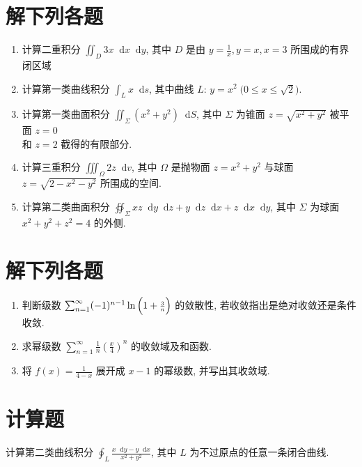 \documentclass[twocolumn,UTF8]{ctexart}
\newcommand\dif{\mathop{}\!\mathrm{d}}
\begin{document}
\newpage\section{解下列各题}
\begin{enumerate}
\item 计算二重积分 $\iint_D3x\dif x\dif y$, 其中 $D$ 是由 $y=\frac{1}{x}$,\,$y=x$,\,$x=3$  所围成的有界闭区域\\[5.5cm]
\item 计算第一类曲线积分 $\int_Lx\dif s$, 其中曲线 $L:\,y=x^2\;\big(0\leqslant x\leqslant\sqrt{2}\big)$.\\[5.5cm]
\item 计算第一类曲面积分 $\iint_\Sigma(x^2+y^2)\dif S$, 其中 $\Sigma$ 为锥面 $z=\sqrt{x^2+y^2}$ 被平面 $z=0$ \\
和 $z=2$ 截得的有限部分.
\end{enumerate}
\newpage%
\begin{enumerate}\setcounter{enumi}{3}
\item 计算三重积分 $\iiint_\Omega2z\dif v$, 其中 $\Omega$ 是抛物面 $z=x^2+y^2$ 与球面 $z=\sqrt{2-x^2-y^2}$ 所围成的空间.\\[9cm]
\item 计算第二类曲面积分 $\oiint_\Sigma xz\dif y\dif z+y\dif z\dif x+z\dif x\dif y$, 其中 $\Sigma$ 为球面 $x^2+y^2+z^2=4$ 的外侧.
\end{enumerate}
\newpage\section{解下列各题}
\begin{enumerate}
\item 判断级数 $\sum_{n=1}^{\infty}(-1)^{n-1}\ln\Big(1+\scaleobj{0.8}{\frac{3}{n}}\Big)$ 的敛散性, 若收敛指出是绝对收敛还是条件收敛.\\[9cm]
\item 求幂级数 $\sum_{n=1}^{\infty}\frac{1}{n}\left(\frac{x}{4}\right)^n$ 的收敛域及和函数.
\newpage
\item 将 $f(x)=\frac{1}{4-x}$ 展开成 $x-1$ 的幂级数,  并写出其收敛域.\\[8cm]
\end{enumerate}
\section{计算题}
计算第二类曲线积分 $\oint_L\frac{x\dif y-y\dif x}{x^2+y^2}$, 其中 $L$ 为不过原点的任意一条闭合曲线.
\end{document}

